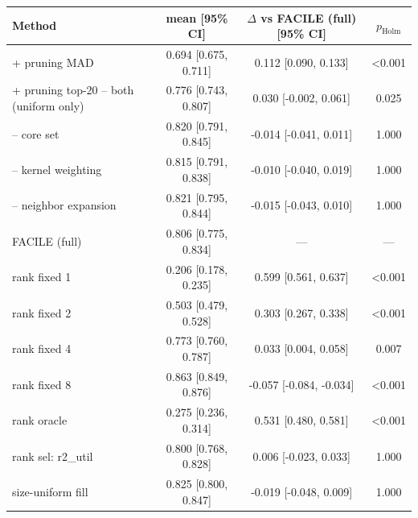 \begin{tabular}{lccc}
\toprule
Method & mean [95\% CI] & $\Delta$ vs FACILE (full) [95\% CI] & $p_{\mathrm{Holm}}$ \\
\midrule
+ pruning MAD & 0.694 [0.675, 0.711] & 0.112 [0.090, 0.133] & <0.001 \\
+ pruning top-20%
-- both (uniform only) & 0.776 [0.743, 0.807] & 0.030 [-0.002, 0.061] & 0.025 \\
-- core set & 0.820 [0.791, 0.845] & -0.014 [-0.041, 0.011] & 1.000 \\
-- kernel weighting & 0.815 [0.791, 0.838] & -0.010 [-0.040, 0.019] & 1.000 \\
-- neighbor expansion & 0.821 [0.795, 0.844] & -0.015 [-0.043, 0.010] & 1.000 \\
FACILE (full) & 0.806 [0.775, 0.834] & --- & --- \\
rank fixed 1 & 0.206 [0.178, 0.235] & 0.599 [0.561, 0.637] & <0.001 \\
rank fixed 2 & 0.503 [0.479, 0.528] & 0.303 [0.267, 0.338] & <0.001 \\
rank fixed 4 & 0.773 [0.760, 0.787] & 0.033 [0.004, 0.058] & 0.007 \\
rank fixed 8 & 0.863 [0.849, 0.876] & -0.057 [-0.084, -0.034] & <0.001 \\
rank oracle & 0.275 [0.236, 0.314] & 0.531 [0.480, 0.581] & <0.001 \\
rank sel: r2_util & 0.800 [0.768, 0.828] & 0.006 [-0.023, 0.033] & 1.000 \\
size-uniform fill & 0.825 [0.800, 0.847] & -0.019 [-0.048, 0.009] & 1.000 \\
\bottomrule
\end{tabular}

